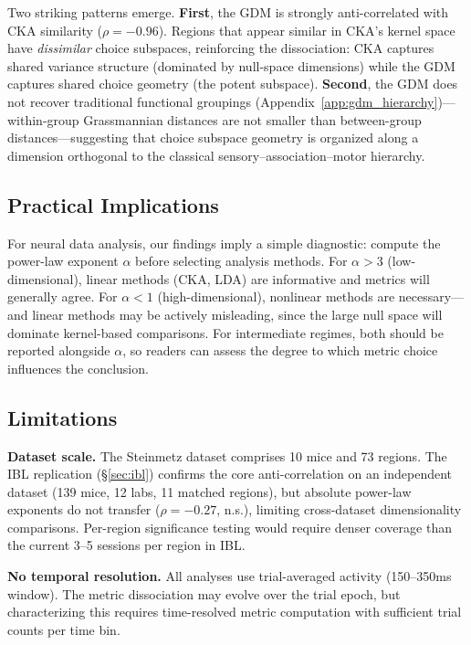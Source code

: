 \documentclass{article}
\begin{document}
Two striking patterns emerge. \textbf{First}, the GDM is strongly anti-correlated with CKA similarity ($\rho = -0.96$). Regions that appear similar in CKA's kernel space have \emph{dissimilar} choice subspaces, reinforcing the dissociation: CKA captures shared variance structure (dominated by null-space dimensions) while the GDM captures shared choice geometry (the potent subspace). \textbf{Second}, the GDM does not recover traditional functional groupings (Appendix~\ref{app:gdm_hierarchy})---within-group Grassmannian distances are not smaller than between-group distances---suggesting that choice subspace geometry is organized along a dimension orthogonal to the classical sensory--association--motor hierarchy.

\subsection{Practical Implications}

For neural data analysis, our findings imply a simple diagnostic: compute the power-law exponent $\alpha$ before selecting analysis methods. For $\alpha > 3$ (low-dimensional), linear methods (CKA, LDA) are informative and metrics will generally agree. For $\alpha < 1$ (high-dimensional), nonlinear methods are necessary---and linear methods may be actively misleading, since the large null space will dominate kernel-based comparisons. For intermediate regimes, both should be reported alongside $\alpha$, so readers can assess the degree to which metric choice influences the conclusion.

\subsection{Limitations}

\textbf{Dataset scale.} The Steinmetz dataset comprises 10 mice and 73 regions. The IBL replication (\S\ref{sec:ibl}) confirms the core anti-correlation on an independent dataset (139 mice, 12 labs, 11 matched regions), but absolute power-law exponents do not transfer ($\rho = -0.27$, n.s.), limiting cross-dataset dimensionality comparisons. Per-region significance testing would require denser coverage than the current 3--5 sessions per region in IBL.

\textbf{No temporal resolution.} All analyses use trial-averaged activity (150--350ms window). The metric dissociation may evolve over the trial epoch, but characterizing this requires time-resolved metric computation with sufficient trial counts per time bin.
\end{document}
